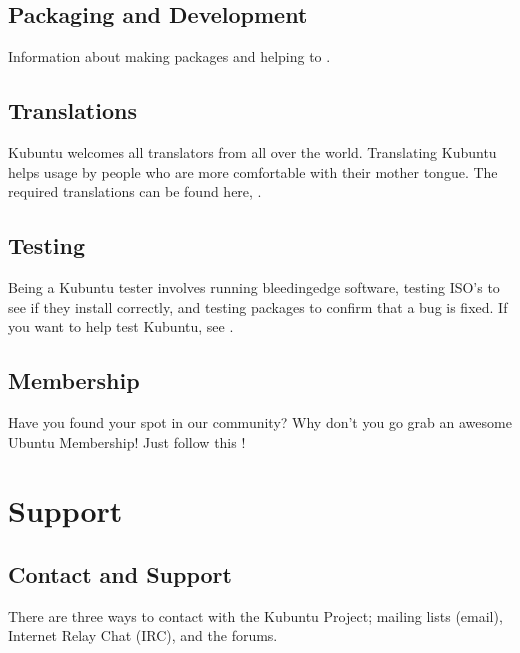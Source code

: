 \documentclass[letterpaper,10pt,english]{sphinxmanual}
\begin{document}
\section{Packaging and Development}
\label{\detokenize{docs/contribute:packaging-and-development}}
\sphinxAtStartPar
Information about making packages and helping to .


\section{Translations}
\label{\detokenize{docs/contribute:translations}}
\sphinxAtStartPar
Kubuntu welcomes all translators from all over the world. Translating Kubuntu helps usage by people who are more comfortable with their mother tongue. The required translations can be found here, .


\section{Testing}
\label{\detokenize{docs/contribute:testing}}
\sphinxAtStartPar
Being a Kubuntu tester involves running bleeding\sphinxhyphen{}edge software, testing ISO’s to see if they install correctly, and testing packages to confirm that a bug is fixed. If you want to help test Kubuntu, see .


\section{Membership}
\label{\detokenize{docs/contribute:membership}}
\sphinxAtStartPar
Have you found your spot in our community? Why don’t you go grab an awesome Ubuntu Membership! Just follow this !


\chapter{Support}
\label{\detokenize{docs/support:support}}\label{\detokenize{docs/support:support-link}}\label{\detokenize{docs/support::doc}}

\section{Contact and Support}
\label{\detokenize{docs/support:contact-and-support}}
\sphinxAtStartPar
There are three ways to contact with the Kubuntu Project; mailing lists (email), Internet Relay Chat (IRC), and the forums.
\end{document}
